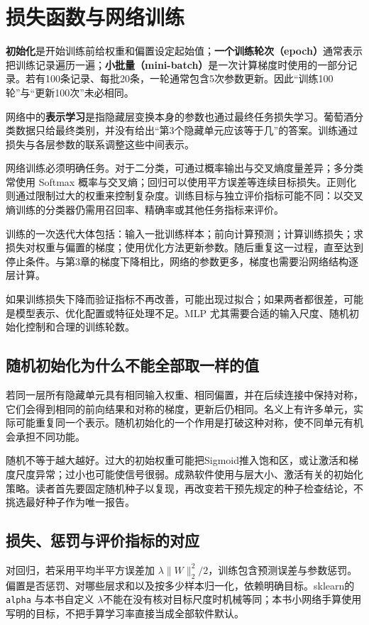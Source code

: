 \section{损失函数与网络训练}

\textbf{初始化}是开始训练前给权重和偏置设定起始值；\textbf{一个训练轮次（epoch）}通常表示把训练记录遍历一遍；\textbf{小批量（mini-batch）}是一次计算梯度时使用的一部分记录。若有100条记录、每批20条，一轮通常包含5次参数更新。因此“训练100轮”与“更新100次”未必相同。

网络中的\textbf{表示学习}是指隐藏层变换本身的参数也通过最终任务损失学习。葡萄酒分类数据只给最终类别，并没有给出“第3个隐藏单元应该等于几”的答案。训练通过损失与各层参数的联系调整这些中间表示。

网络训练必须明确任务。对于二分类，可通过概率输出与交叉熵度量差异；多分类常使用 Softmax 概率与交叉熵；回归可以使用平方误差等连续目标损失。正则化则通过限制过大的权重来控制复杂度。训练目标与独立评价指标可能不同：以交叉熵训练的分类器仍需用召回率、精确率或其他任务指标来评价。

训练的一次迭代大体包括：输入一批训练样本；前向计算预测；计算训练损失；求损失对权重与偏置的梯度；使用优化方法更新参数。随后重复这一过程，直至达到停止条件。与第3章的梯度下降相比，网络的参数更多，梯度也需要沿网络结构逐层计算。

如果训练损失下降而验证指标不再改善，可能出现过拟合；如果两者都很差，可能是模型表示、优化配置或特征处理不足。MLP 尤其需要合适的输入尺度、随机初始化控制和合理的训练轮数。

\subsection{随机初始化为什么不能全部取一样的值}
若同一层所有隐藏单元具有相同输入权重、相同偏置，并在后续连接中保持对称，它们会得到相同的前向结果和对称的梯度，更新后仍相同。名义上有许多单元，实际可能重复同一个表示。随机初始化的一个作用是打破这种对称，使不同单元有机会承担不同功能。

随机不等于越大越好。过大的初始权重可能把Sigmoid推入饱和区，或让激活和梯度尺度异常；过小也可能使信号很弱。成熟软件使用与层大小、激活有关的初始化策略。读者首先要固定随机种子以复现，再改变若干预先规定的种子检查结论，不挑选最好种子作为唯一报告。

\subsection{损失、惩罚与评价指标的对应}
对回归，若采用平均半平方误差加 $\lambda\|W\|_2^2/2$，训练包含预测误差与参数惩罚。偏置是否惩罚、对哪些层求和以及按多少样本归一化，依赖明确目标。sklearn的 \texttt{alpha} 与本书自定义 $\lambda$不能在没有核对目标尺度时机械等同；本书小网络手算使用写明的目标，不把手算学习率直接当成全部软件默认。

